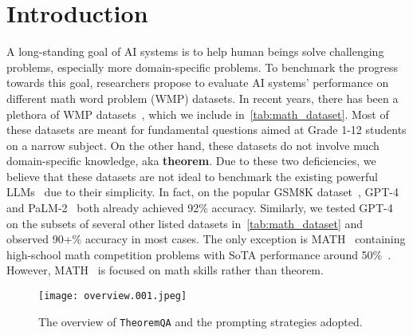 \documentclass[11pt]{article}
\newcommand{\dataset}{\texttt{TheoremQA}\xspace}
\begin{document}
\section{Introduction}
A long-standing goal of AI systems is to help human beings solve challenging problems, especially more domain-specific problems. To benchmark the progress towards this goal, researchers propose to evaluate AI systems' performance on different math word problem (WMP) datasets.  In recent years, there has been a plethora of WMP datasets~\cite{lu2023dl4math}, which we include in~\autoref{tab:math_dataset}. Most of these datasets are meant for fundamental questions aimed at Grade 1-12 students on a narrow subject. On the other hand, these datasets do not involve much domain-specific knowledge, aka \textbf{theorem}. Due to these two deficiencies, we believe that these datasets are not ideal to benchmark the existing powerful LLMs~\cite{brown2020language,tamkin2022task,chen2021evaluating,chowdhery2022palm,hoffmann2022training,taylor2022galactica} due to their simplicity. In fact, on the popular GSM8K dataset~\cite{cobbe2021training}, GPT-4~\cite{gpt4} and PaLM-2~\cite{palm2} both already achieved 92\% accuracy. Similarly, we tested GPT-4~\cite{gpt4} on the subsets of several other listed datasets in~\autoref{tab:math_dataset} and observed 90+\% accuracy in most cases. The only exception is MATH~\cite{hendrycks2measuring} containing high-school math competition problems with SoTA performance around 50\%~\cite{zheng2023progressive}. However, MATH~\cite{hendrycks2measuring} is focused on math skills rather than theorem.
\begin{figure*}
    \centering
    \texttt{[image: overview.001.jpeg]}
    \caption{The overview of \dataset and the prompting strategies adopted.}
    \label{fig:overview}
\end{figure*}
\end{document}
